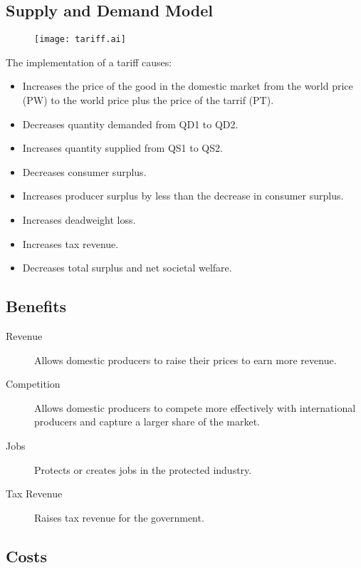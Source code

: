 \documentclass[a4paper,11pt]{report}
\begin{document}
\subsection{Supply and Demand Model}

\begin{figure}
\begin{center}
\texttt{[image: tariff.ai]}
\end{center}
\end{figure}

The implementation of a tariff causes:

\begin{itemize}
\item Increases the price of the good in the domestic market from the world
	price (PW) to the world price plus the price of the tarrif (PT).
\item Decreases quantity demanded from QD1 to QD2.
\item Increases quantity supplied from QS1 to QS2.
\item Decreases consumer surplus.
\item Increases producer surplus by less than the decrease in consumer surplus.
\item Increases deadweight loss.
\item Increases tax revenue.
\item Decreases total surplus and net societal welfare.
\end{itemize}

\subsection{Benefits}

\begin{description}
\item [Revenue] Allows domestic producers to raise their prices to earn
	more revenue.
\item [Competition] Allows domestic producers to compete more effectively with
	international producers and capture a larger share of the market.
\item [Jobs] Protects or creates jobs in the protected industry.
\item [Tax Revenue] Raises tax revenue for the government.
\end{description}

\subsection{Costs}
\end{document}
